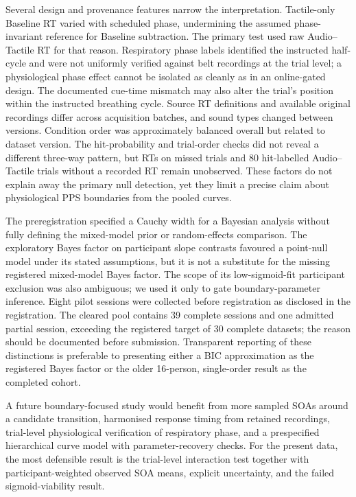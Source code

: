 Several design and provenance features narrow the interpretation. Tactile-only Baseline RT varied with scheduled phase, undermining the assumed phase-invariant reference for Baseline subtraction. The primary test used raw Audio--Tactile RT for that reason. Respiratory phase labels identified the instructed half-cycle and were not uniformly verified against belt recordings at the trial level; a physiological phase effect cannot be isolated as cleanly as in an online-gated design. The documented cue-time mismatch may also alter the trial's position within the instructed breathing cycle. Source RT definitions and available original recordings differ across acquisition batches, and sound types changed between versions. Condition order was approximately balanced overall but related to dataset version. The hit-probability and trial-order checks did not reveal a different three-way pattern, but RTs on missed trials and 80 hit-labelled Audio--Tactile trials without a recorded RT remain unobserved. These factors do not explain away the primary null detection, yet they limit a precise claim about physiological PPS boundaries from the pooled curves.

The preregistration specified a Cauchy width for a Bayesian analysis without fully defining the mixed-model prior or random-effects comparison. The exploratory Bayes factor on participant slope contrasts favoured a point-null model under its stated assumptions, but it is not a substitute for the missing registered mixed-model Bayes factor. The scope of its low-sigmoid-fit participant exclusion was also ambiguous; we used it only to gate boundary-parameter inference. Eight pilot sessions were collected before registration as disclosed in the registration. The cleared pool contains 39 complete sessions and one admitted partial session, exceeding the registered target of 30 complete datasets; the reason should be documented before submission. Transparent reporting of these distinctions is preferable to presenting either a BIC approximation as the registered Bayes factor or the older 16-person, single-order result as the completed cohort.

A future boundary-focused study would benefit from more sampled SOAs around a candidate transition, harmonised response timing from retained recordings, trial-level physiological verification of respiratory phase, and a prespecified hierarchical curve model with parameter-recovery checks. For the present data, the most defensible result is the trial-level interaction test together with participant-weighted observed SOA means, explicit uncertainty, and the failed sigmoid-viability result.

